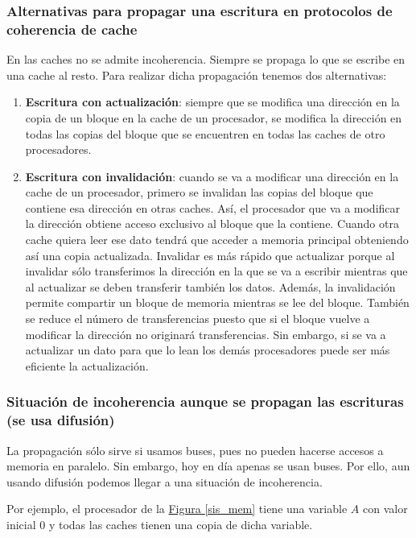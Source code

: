 \documentclass[10pt,a4paper,spanish]{report}
\begin{document}
\newpage
\textcolor[rgb]{0.2,0.4,0.8}{\subsubsection{Alternativas para propagar una escritura en protocolos de coherencia de cache}}
En las caches no se admite incoherencia. Siempre se propaga lo que se escribe en una cache al resto. Para realizar dicha propagación tenemos dos alternativas:
\begin{enumerate}[\color{azul}{\bf $\heartsuit$}]
    \item \textcolor[rgb]{0.2,0.4,0.8}{\textbf{Escritura con actualización}}: siempre que se modifica una dirección en la copia de un bloque en la cache de un procesador, se modifica la dirección en todas las copias del bloque que se encuentren en todas las caches de otro procesadores.
    \item \textcolor[rgb]{0.2,0.4,0.8}{\textbf{Escritura con invalidación}}: cuando se va a modificar una dirección en la cache de un procesador, primero se invalidan las copias del bloque que contiene esa dirección en otras caches. Así, el procesador que va a modificar la dirección obtiene acceso exclusivo al bloque que la contiene. Cuando otra cache quiera leer ese dato tendrá que acceder a memoria principal obteniendo así una copia actualizada. Invalidar es más rápido que actualizar porque al invalidar sólo transferimos la dirección en la que se va a escribir mientras que al actualizar se deben transferir también los datos. Además, la invalidación permite compartir un bloque de memoria mientras se lee del bloque. También se reduce el número de transferencias puesto que si el bloque vuelve a modificar la dirección no originará transferencias. Sin embargo, si se va a actualizar un dato para que lo lean los demás procesadores puede ser más eficiente la actualización.
\end{enumerate}

\textcolor[rgb]{0.2,0.4,0.8}{\subsubsection{Situación de incoherencia aunque se propagan las escrituras (se usa difusión)}}
La propagación sólo sirve si usamos buses, pues no pueden hacerse accesos a memoria en paralelo. Sin embargo, hoy en día apenas se usan buses. Por ello, aun usando difusión podemos llegar a una situación de incoherencia.

Por ejemplo, el procesador de la \hyperref[sis_mem]{Figura \ref*{sis_mem}} tiene una variable $A$ con valor inicial $0$ y todas las caches tienen una copia de dicha variable.
\end{document}
